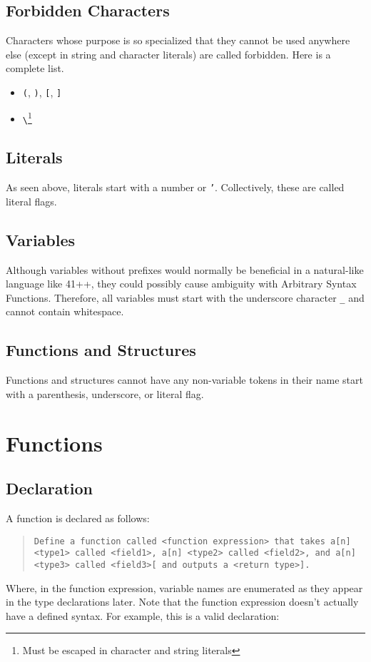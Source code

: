 \documentclass{article}
\newcommand{\code}[1]{\texttt{#1}}
\newcommand{\codeblock}[1]{\begin{quote}\code{#1}\end{quote}}
\begin{document}
\subsection{Forbidden Characters}
Characters whose purpose is so specialized that they cannot be used anywhere else (except in string and character literals) are called forbidden. Here is a complete list.
\begin{itemize}
\item \code{(}, \code{)}, \code{[}, \code{]}
\item \code{\textbackslash}\footnote{Must be escaped in character and string literals}
\end{itemize}
\subsection{Literals}
As seen above, literals start with a number or \code{'}. Collectively, these are called literal flags.
\subsection{Variables}
Although variables without prefixes would normally be beneficial in a natural-like language like 41++, they could possibly cause ambiguity with Arbitrary Syntax Functions. Therefore, all variables must start with the underscore character \code{\_} and cannot contain whitespace.
\subsection{Functions and Structures}
Functions and structures cannot have any non-variable tokens in their name start with a parenthesis, underscore, or literal flag.
\section{Functions}
\subsection{Declaration}
A function is declared as follows:

\codeblock{Define a function called <function expression> that takes a[n] <type1> called <field1>, a[n] <type2> called <field2>, and a[n] <type3> called <field3>[ and outputs a <return type>].}

Where, in the function expression, variable names are enumerated as they appear in the type declarations later. Note that the function expression doesn't actually have a defined syntax. For example, this is a valid declaration:
\end{document}

